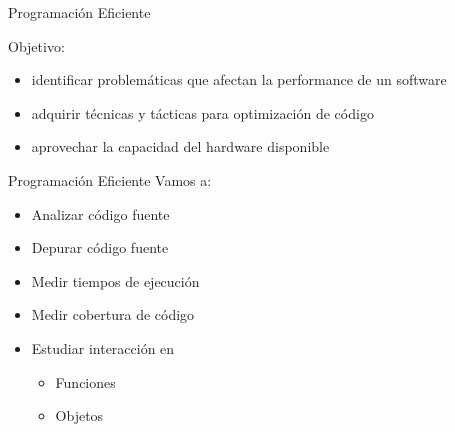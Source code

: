 \begin{frame}{Programación Eficiente}
    \begin{center}
    \end{center}

    \vspace{.5cm}Objetivo:
    \begin{itemize}
        \item identificar problemáticas que afectan la performance de un software
        \item adquirir técnicas y tácticas para optimización de código
        \item aprovechar la capacidad del hardware disponible
    \end{itemize}
\end{frame}

\begin{frame}{Programación Eficiente}
    Vamos a:
    \begin{itemize}
        \item Analizar código fuente
        \item Depurar código fuente
        \item Medir tiempos de ejecución
        \item Medir cobertura de código
        \item Estudiar interacción en
        \begin{itemize}
            \item Funciones
            \item Objetos
        \end{itemize}
    \end{itemize}
\end{frame}

